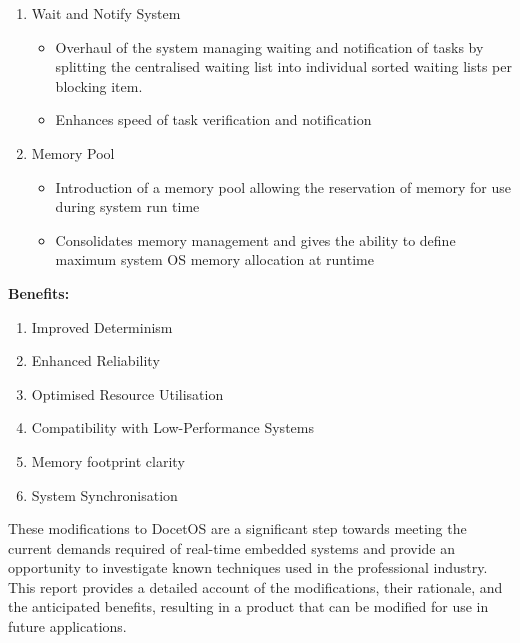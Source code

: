 \begin{enumerate}
	\item Wait and Notify System
	\begin{itemize}
		\item Overhaul of the system managing waiting and notification of tasks by splitting the centralised waiting list into individual sorted waiting lists per blocking item.
		\item Enhances speed of task verification and notification
	\end{itemize}
	
	\item Memory Pool
	\begin{itemize}
		\item Introduction of a memory pool allowing the reservation of memory for use during system run time
		\item Consolidates memory management and gives the ability to define maximum system OS memory allocation at runtime
	\end{itemize}
	
\end{enumerate}
\textbf{Benefits:}
\begin{enumerate}
	\item Improved Determinism
	\item Enhanced Reliability
	\item Optimised Resource Utilisation
	\item Compatibility with Low-Performance Systems
	\item Memory footprint clarity
	\item System Synchronisation
\end{enumerate}
These modifications to DocetOS are a significant step towards meeting the current demands required of real-time embedded systems and provide an opportunity to investigate known techniques used in the professional industry. This report provides a detailed account of the modifications, their rationale, and the anticipated benefits, resulting in a product that can be modified for use in future applications. \hfill\break
